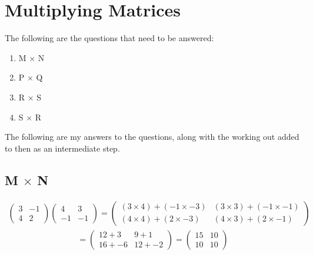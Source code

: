 \documentclass[a4paper,10pt]{article}
\begin{document}
  \newpage

  \section{Multiplying Matrices}
    The following are the questions that need to be answered:

    \begin{enumerate}
      \item M $\times$ N
      \item P $\times$ Q
      \item R $\times$ S
      \item S $\times$ R
    \end{enumerate}

    The following are my answers to the questions, along with the working out added to then as an intermediate step.
    \subsection{M $\times$ N}
      \begin{align*}
        \begin{pmatrix}
          3 & -1\\
          4 & 2
        \end{pmatrix}
        \begin{pmatrix}
          4 & 3\\
          -1 & -1
        \end{pmatrix}
        =
        \begin{pmatrix}
          (3 \times 4) + (-1 \times -3) & (3 \times 3) + (-1 \times -1)\\
          (4 \times 4) + (2 \times -3) & (4 \times 3) + (2 \times -1)
        \end{pmatrix}
      \end{align*}
      \begin{align*}
        =
        \begin{pmatrix}
          12 + 3 & 9 + 1\\
          16 + -6 & 12 + -2
        \end{pmatrix}
        =
        \begin{pmatrix}
          15 & 10\\
          10 & 10
        \end{pmatrix}
      \end{align*}
\end{document}
